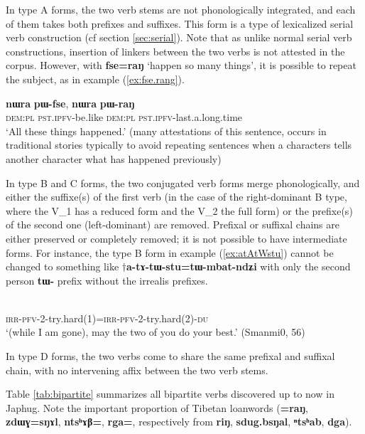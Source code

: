 \documentclass[oneside,a4paper,11pt]{article}
\newcommand{\ipa}[1]{{\phon\textbf{#1}}}
\newcommand{\jpg}[2]{\ipa{#1} `#2'}
\newcommand{\refb}[1]{(\ref{#1})}
\begin{document}
In type A forms, the two verb stems are not phonologically integrated, and each of them takes both prefixes and suffixes. This form is a type of lexicalized serial verb construction (cf section \ref{sec:serial}). Note that as unlike normal serial verb constructions, insertion of linkers between the two verbs is not attested in the corpus. However, with \jpg{fse=raŋ}{happen so many things}, it is possible to repeat the subject, as in example \refb{ex:fse.rang}.

\begin{exe}
\ex \label{ex:fse.rang}
\gll 
\ipa{nɯra} \ipa{pɯ-fse}, \ipa{nɯra} \ipa{pɯ-raŋ} \\
\textsc{dem:pl} \textsc{pst.ipfv}-be.like \textsc{dem:pl} \textsc{pst.ipfv}-last.a.long.time \\ 
\glt `All these things happened.' (many attestations of this sentence, occurs in traditional stories typically to avoid repeating sentences when a characters tells another character what has happened previously)
\end{exe}

In type B and C forms, the two conjugated verb forms merge phonologically, and either the suffixe(s) of the first verb (in the case of the right-dominant B type, where the V_1 has a reduced form and the V_2 the full form) or the prefixe(s) of the second one (left-dominant) are removed. Prefixal or suffixal chains are either preserved or completely removed; it is not possible to have intermediate forms. For instance, the type B form in example \refb{ex:atAtWstu} cannot be changed to something like $\dagger$\ipa{a-tɤ-tɯ-stu=tɯ-mbat-ndʑi} with only the second person \ipa{tɯ-} prefix without the irrealis prefixes.

\begin{exe}
\ex \label{ex:atAtWstu}
\gll \ipa{a-tɤ-tɯ-stu=a-tɤ-tɯ-mbat-ndʑi} \\
\textsc{irr-pfv-2}-try.hard(1)=\textsc{irr-pfv-2}-try.hard(2)-\textsc{du} \\
\glt `(while I am gone),  may the two of you do your best.' (Smanmi0, 56)
\end{exe}

In type D forms, the two verbs come to share the same prefixal and suffixal chain, with no intervening affix between the two verb stems.

Table \ref{tab:bipartite} summarizes all bipartite verbs discovered up to now in Japhug. Note the important proportion of Tibetan loanwords (\ipa{=raŋ}, \ipa{zdɯɣ=sŋɤl}, \ipa{ntsʰɤβ=}, \ipa{rga=}, respectively from \ipa{riŋ}, \ipa{sdug.bsŋal}, \ipa{ⁿtsʰab}, \ipa{dga}).
\end{document}
